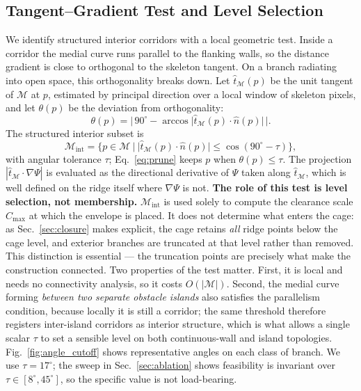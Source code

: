 \documentclass[conference]{IEEEtran}
\begin{document}
\subsection{Tangent--Gradient Test and Level Selection}
\label{sec:leveltest}
We identify structured interior corridors with a local geometric test. Inside a corridor the medial curve runs parallel to the flanking walls, so the distance gradient is close to orthogonal to the skeleton tangent. On a branch radiating into open space, this orthogonality breaks down. Let $\hat{t}_{\mathcal{M}}(p)$ be the unit tangent of $\mathcal{M}$ at $p$, estimated by principal direction over a local window of skeleton pixels, and let $\theta(p)$ be the deviation from orthogonality:
\begin{equation}
\theta(p)=\Big|\,90^\circ-\arccos\big|\hat{t}_{\mathcal{M}}(p)\cdot \hat{n}(p)\big|\,\Big| .
\end{equation}
The structured interior subset is
\begin{equation}
\mathcal{M}_{\mathrm{int}}=\big\{p\in\mathcal{M}\ \big|\ \big|\hat{t}_{\mathcal{M}}(p)\cdot\hat{n}(p)\big|\le \cos(90^\circ-\tau)\big\},
\label{eq:prune}
\end{equation}
with angular tolerance $\tau$; Eq.~\eqref{eq:prune} keeps $p$ when $\theta(p)\le\tau$. The projection $|\hat{t}_{\mathcal{M}}\cdot\nabla\Psi|$ is evaluated as the directional derivative of $\Psi$ taken along $\hat{t}_{\mathcal{M}}$, which is well defined on the ridge itself where $\nabla\Psi$ is not.
\textbf{The role of this test is level selection, not membership.} $\mathcal{M}_{\mathrm{int}}$ is used solely to compute the clearance scale $C_{\max}$ at which the envelope is placed. It does not determine what enters the cage: as Sec.~\ref{sec:closure} makes explicit, the cage retains \emph{all} ridge points below the cage level, and exterior branches are truncated at that level rather than removed. This distinction is essential --- the truncation points are precisely what make the construction connected.
Two properties of the test matter. First, it is local and needs no connectivity analysis, so it costs $O(|\mathcal{M}|)$. Second, the medial curve forming \emph{between two separate obstacle islands} also satisfies the parallelism condition, because locally it is still a corridor; the same threshold therefore registers inter-island corridors as interior structure, which is what allows a single scalar $\tau$ to set a sensible level on both continuous-wall and island topologies. Fig.~\ref{fig:angle_cutoff} shows representative angles on each class of branch. We use $\tau=17^\circ$; the sweep in Sec.~\ref{sec:ablation} shows feasibility is invariant over $\tau\in[8^\circ,45^\circ]$, so the specific value is not load-bearing.
\end{document}
